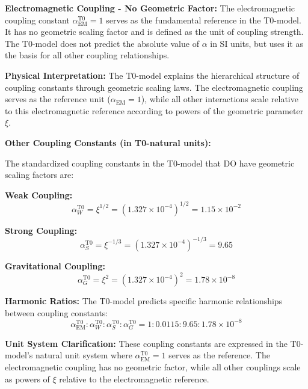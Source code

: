 \documentclass[12pt,a4paper]{article}
\newcommand{\xigeom}{\xi}
\begin{document}
\textbf{Electromagnetic Coupling - No Geometric Factor:}
The electromagnetic coupling constant $\alpha_{\text{EM}}^{\text{T0}} = 1$ serves as the fundamental reference in the T0-model. It has no geometric scaling factor and is defined as the unit of coupling strength. The T0-model does not predict the absolute value of $\alpha$ in SI units, but uses it as the basis for all other coupling relationships.

\textbf{Physical Interpretation:} The T0-model explains the hierarchical structure of coupling constants through geometric scaling laws. The electromagnetic coupling serves as the reference unit ($\alpha_{\text{EM}} = 1$), while all other interactions scale relative to this electromagnetic reference according to powers of the geometric parameter $\xigeom$.

\textbf{Other Coupling Constants (in T0-natural units):}

The standardized coupling constants in the T0-model that DO have geometric scaling factors are:

\textbf{Weak Coupling:}
\begin{equation}
	\alpha_W^{\text{T0}} = \xigeom^{1/2} = (1.327 \times 10^{-4})^{1/2} = 1.15 \times 10^{-2}
\end{equation}

\textbf{Strong Coupling:}
\begin{equation}
	\alpha_S^{\text{T0}} = \xigeom^{-1/3} = (1.327 \times 10^{-4})^{-1/3} = 9.65
\end{equation}

\textbf{Gravitational Coupling:}
\begin{equation}
	\alpha_G^{\text{T0}} = \xigeom^2 = (1.327 \times 10^{-4})^2 = 1.78 \times 10^{-8}
\end{equation}

\textbf{Harmonic Ratios:}
The T0-model predicts specific harmonic relationships between coupling constants:
\begin{equation}
	\alpha_{\text{EM}}^{\text{T0}} : \alpha_W^{\text{T0}} : \alpha_S^{\text{T0}} : \alpha_G^{\text{T0}} = 1 : 0.0115 : 9.65 : 1.78 \times 10^{-8}
\end{equation}

\textbf{Unit System Clarification:} 
These coupling constants are expressed in the T0-model's natural unit system where $\alpha_{\text{EM}}^{\text{T0}} = 1$ serves as the reference. The electromagnetic coupling has no geometric factor, while all other couplings scale as powers of $\xigeom$ relative to the electromagnetic reference.
\end{document}
